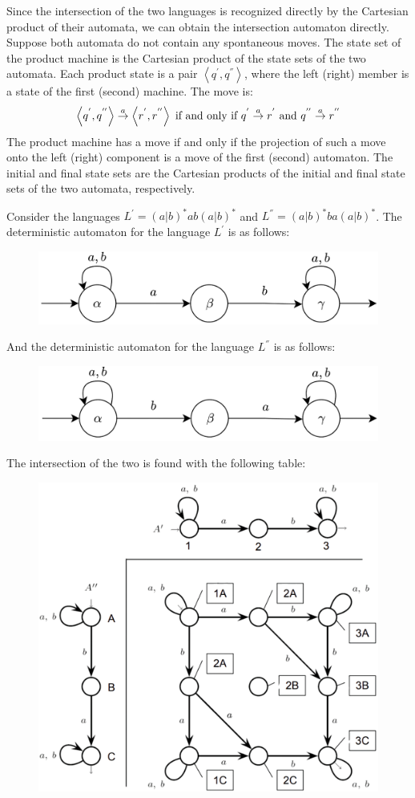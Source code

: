 Since the intersection of the two languages is recognized directly by the Cartesian product of their automata, we can obtain the intersection automaton directly. 
Suppose both automata do not contain any spontaneous moves. 
The state set of the product machine is the Cartesian product of the state sets of the two automata. 
Each product state is a pair $\left\langle q^{'},q^{''} \right\rangle $, where the left (right) member is a state of the first (second) machine. 
The move is: 
\[\left\langle q^{'},q^{''} \right\rangle \overset{a}{\rightarrow} \left\langle r^{'},r^{''} \right\rangle \textnormal{ if and only if } q^{'} \overset{a}{\rightarrow} r^{'} \textnormal{ and } q^{''} \overset{a}{\rightarrow} r^{''}\]
The product machine has a move if and only if the projection of such a move onto the left (right) component is a move of the first (second) automaton. 
The initial and final state sets are the Cartesian products of the initial and final state sets of the two automata, respectively. 
\begin{example}
    Consider the languages $L^{'}=(a|b)^{*}ab(a|b)^{*}$ and $L^{''}=(a|b)^{*}ba(a|b)^{*}$. 
    The deterministic automaton for the language $L^{'}$ is as follows: 
    \begin{figure}[H]
        \centering
        \includegraphics[width=0.5\linewidth]{images/int.png}
    \end{figure}
    And the deterministic automaton for the language $L^{''}$ is as follows: 
    \begin{figure}[H]
        \centering
        \includegraphics[width=0.5\linewidth]{images/int1.png}
    \end{figure}
    The intersection of the two is found with the following table: 
    \begin{figure}[H]
        \centering
        \includegraphics[width=0.75\linewidth]{images/int2.png}
    \end{figure}
\end{example}